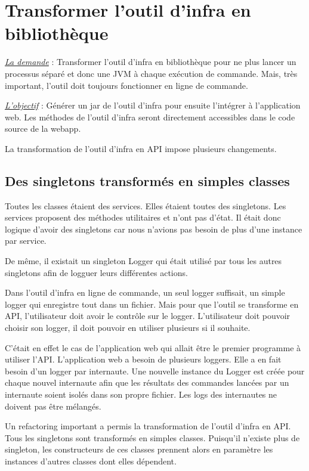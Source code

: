 \section{Transformer l'outil d'infra en bibliothèque}

\underline{\textit{La demande}} : Transformer l'outil d'infra en bibliothèque pour ne plus
lancer un processus séparé et donc une JVM à chaque exécution de commande.
Mais, très important, l'outil doit toujours fonctionner en ligne de
commande.

\underline{\textit{L'objectif}} : Générer un jar de l'outil d'infra pour ensuite
l'intégrer à l'application web. Les méthodes de l'outil d'infra seront
directement accessibles dans le code source de la webapp.

La transformation de l'outil d'infra en API impose plusieurs changements.

\subsection{Des singletons transformés en simples classes}

Toutes les classes étaient des services. Elles étaient toutes des singletons.
Les services proposent des méthodes utilitaires et n'ont pas d'état. Il était
donc logique d'avoir des singletons car nous n'avions pas besoin de plus d'une
instance par service. 

De même, il existait un singleton Logger qui était utilisé par tous les autres
singletons afin de logguer leurs différentes actions.

Dans l'outil d'infra en ligne de commande, un seul logger suffisait, un simple
logger qui enregistre tout dans un fichier.
Mais pour que l'outil se transforme en API, l'utilisateur doit avoir le
contrôle sur le logger. L'utilisateur doit pouvoir choisir son logger, il doit
pouvoir en utiliser plusieurs si il souhaite.

C'était en effet le cas de l'application web qui allait être le premier
programme à utiliser l'API. L'application web a besoin de plusieurs
loggers. Elle a en fait besoin d'un logger par internaute.
Une nouvelle instance du Logger est créée pour chaque nouvel internaute afin
que les résultats des commandes lancées par un internaute soient isolés dans son
propre fichier. Les logs des internautes ne doivent pas être mélangés.

Un refactoring important a permis la transformation de l'outil d'infra en API.
Tous les singletons sont transformés en simples classes.
Puisqu'il n'existe plus de singleton, les constructeurs de ces classes prennent
alors en paramètre les instances d'autres classes dont elles dépendent.

